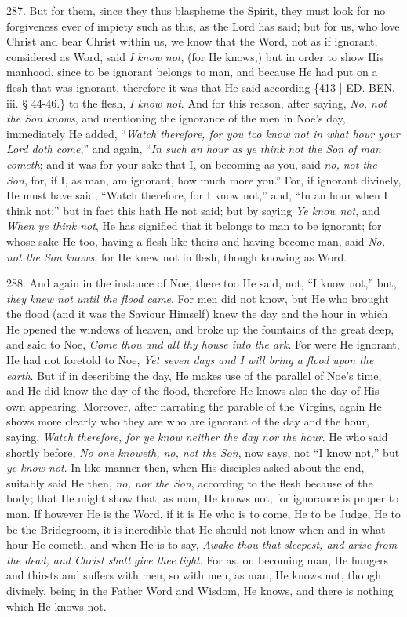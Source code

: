 287.
But for them, since they thus blaspheme the Spirit, they must look for
no forgiveness ever of impiety such as this, as the Lord has said; but
for us, who love Christ and bear Christ within us, we know that the
Word, not as if ignorant, considered as Word, said \emph{I know not},
(for He knows,) but in order to show His manhood, since to be ignorant
belongs to man, and because He had put on a flesh that was ignorant,
therefore it was that He said according \{413 | ED.
BEN. iii. § 44-46.\} to the flesh, \emph{I know
not}. And for this reason, after saying, \emph{No, not the Son knows},
and mentioning the ignorance of the men in Noe's day, immediately He
added, ``\emph{Watch therefore, for you too know not in what hour your
Lord doth come},'' and again, ``\emph{In such an hour as ye think not
the Son of man cometh}; and it was for your sake that I, on
becoming as you, said \emph{no, not the Son}, for, if I, as man, am
ignorant, how much more you.'' For, if ignorant divinely, He must have
said, ``Watch therefore, for I know not,'' and, ``In an hour when I think
not;'' but in fact this hath He not said; but by saying \emph{Ye know not},
and \emph{When ye think not}, He has signified that it belongs to man
to be ignorant; for whose sake He too, having a flesh like theirs and
having become man, said \emph{No, not the Son knows}, for He knew not
in flesh, though knowing as Word.

288.
And again in the instance of Noe, there too He said, not, ``I know not,''
but, \emph{they knew not until the flood came}. For men did not know,
but He who brought the flood (and it was the Saviour Himself) knew the
day and the hour in which He opened the windows of heaven, and broke
up the fountains of the great deep, and said to Noe, \emph{Come thou and
all thy house into the ark}. For were He ignorant, He had not
foretold to Noe, \emph{Yet seven days and I will bring a flood upon the
earth}. But if in describing the day, He makes use of the parallel
of Noe's time, and He did know the day of the flood, therefore He
knows also the day of His own appearing. Moreover, after narrating the
parable of the Virgins, again He shows more clearly who they are who
are ignorant of the day and the hour, saying, \emph{Watch therefore, for
ye know neither the day nor the hour}. He who said shortly before, \emph{No
one knoweth, no, not the Son}, now says, not ``I know not,'' but \emph{ye
know not}. In like manner then, when His disciples asked about the
end, suitably said He then, \emph{no, nor the Son}, according to the
flesh because of the body; that He might show that, as man, He knows not; for ignorance is proper to man. If however He is the Word,
if it is He who is to come, He to be Judge, He to be the Bridegroom,
it is incredible that He should not know when and in what hour He
cometh, and when He is to say, \emph{Awake thou that sleepest, and arise
from the dead, and Christ shall give thee light}. For as, on
becoming man, He hungers and thirsts and suffers with men, so with
men, as man, He knows not, though divinely, being in the Father Word
and Wisdom, He knows, and there is nothing which He knows not.

